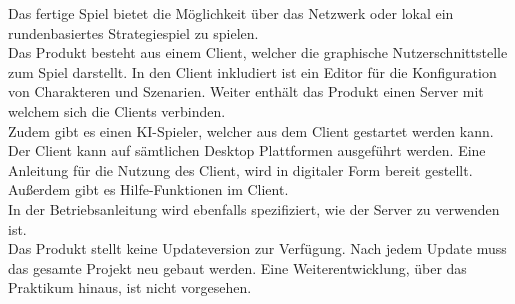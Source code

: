Das fertige Spiel bietet die Möglichkeit über das Netzwerk oder lokal ein rundenbasiertes
Strategiespiel zu spielen.\\
Das Produkt besteht aus einem Client, welcher die graphische Nutzerschnittstelle zum Spiel
darstellt. In den Client inkludiert ist ein Editor für die Konfiguration von Charakteren und
Szenarien. Weiter enthält das Produkt einen Server mit welchem sich die Clients verbinden.\\
Zudem gibt es einen KI-Spieler, welcher aus dem Client gestartet werden kann.\\
Der Client kann auf sämtlichen Desktop Plattformen ausgeführt werden. Eine Anleitung für die Nutzung des Client, wird in digitaler Form bereit gestellt. 
Außerdem gibt es Hilfe-Funktionen im Client.\\
In der Betriebsanleitung wird ebenfalls spezifiziert, wie der Server zu verwenden ist.\\

Das Produkt stellt keine Updateversion zur Verfügung. Nach jedem Update muss das gesamte Projekt
neu gebaut werden. Eine Weiterentwicklung, über das Praktikum hinaus, ist nicht vorgesehen.
